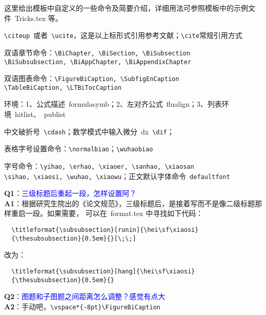 这里给出模板中自定义的一些命令及简要介绍，详细用法可参照模板中的示例文件~Tricks.tex 等。
\begin{hitlist}
\item \verb+\citeup+~或者~\verb+\ucite+，这是以上标形式引用参考文献；\verb+\cite+常规引用方式
\item 双语章节命令：\verb+\BiChapter, \BiSection, \BiSubsection+\\
\verb+\BiSubsubsection, \BiAppChapter, \BiAppendixChapter+
\item 双语图表命令：\verb+\FigureBiCaption, \SubfigEnCaption+\\
\verb+\TableBiCaption, \LTBiTocCaption+
\item 环境：1、公式描述~formulasymb；2、左对齐公式~flualign；3、列表环境~hitlist、~publist 
\item 中文破折号~\verb+\cdash+；数学模式中输入微分~dx~\verb+\dif+；
\item 表格字号设置命令：\verb+\normalbiao+；\verb+\wuhaobiao+
\item 字号命令：\verb+\yihao, \erhao, \xiaoer, \sanhao, \xiaosan+\\
\verb+\sihao, \xiaosi, \wuhao, \xiaowu+；正文默认字体命令~\verb+defaultfont+
\end{hitlist}


\noindent \textbf{Q1}：\textcolor{blue}{三级标题后重起一段，怎样设置阿？}\\
\textbf{A1}：根据研究生院出的《论文规范》，三级标题后，是接着写而不是像二级标题那样重启一段。如果需要，
可以在~format.tex 中寻找如下代码：
\begin{verbatim}
  \titleformat{\subsubsection}[runin]{\hei\sf\xiaosi}
  {\thesubsubsection}{0.5em}{}[\;\;]
\end{verbatim}
改为：
\begin{verbatim}
  \titleformat{\subsubsection}[hang]{\hei\sf\xiaosi}
  {\thesubsubsection}{0.5em}{}
\end{verbatim}

\noindent \textbf{Q2}：\textcolor{blue}{图题和子图题之间距离怎么调整？感觉有点大}\\
\textbf{A2}：手动吧，\verb+\vspace*{-8pt}\FigureBiCaption+

